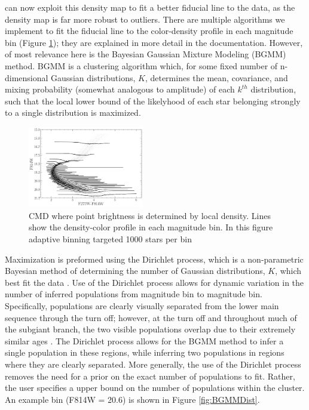 \fidanka can now exploit this density map to fit a better fiducial line to the
data, as the density map is far more robust to outliers. There are multiple
algorithms we implement to fit the fiducial line to the color-density profile
in each magnitude bin (Figure \ref{densityBinsDemo}); they are explained in
more detail in the \fidanka documentation. However, of most relevance here is
the Bayesian Gaussian Mixture Modeling (BGMM) method. BGMM is a clustering
algorithm which, for some fixed number of n-dimensional Gaussian distributions,
$K$, determines the mean, covariance, and mixing probability (somewhat
analogous to amplitude) of each $k^{th}$ distribution, such that the local
lower bound of the likelyhood of each star belonging strongly to a single
distribution is maximized. 

\begin{figure}
	\centering
	\includegraphics[width=0.45\textwidth]{DensityBinsDemo.png}
	\caption{CMD where point brightness is determined by local density. Lines show the
	density-color profile in each magnitude bin. In this figure adaptive
	binning targeted 1000 stars per bin}
	\label{densityBinsDemo}
\end{figure}

Maximization is preformed using the Dirichlet process, which is a
non-parametric Bayesian method of determining the number of Gaussian
distributions, $K$, which best fit the data \citep{Ferguson1973, scikit-learn}.
Use of the Dirichlet process allows for dynamic variation in the number of
inferred populations from magnitude bin to magnitude bin. Specifically,
populations are clearly visually separated from the lower main sequence through
the turn off; however, at the turn off and throughout much of the subgiant
branch, the two visible populations overlap due to their extremely similar ages
\citep[i.e.][]{Jordan2002}. The Dirichlet process allows for the BGMM method to
infer a single population in these regions, while inferring two populations in
regions where they are clearly separated. More generally, the use of the
Dirichlet process removes the need for a prior on the exact number of
populations to fit. Rather, the user specifies a upper bound on the number of
populations within the cluster. An example bin (F814W = 20.6) is shown in
Figure \ref{fig:BGMMDist}.

